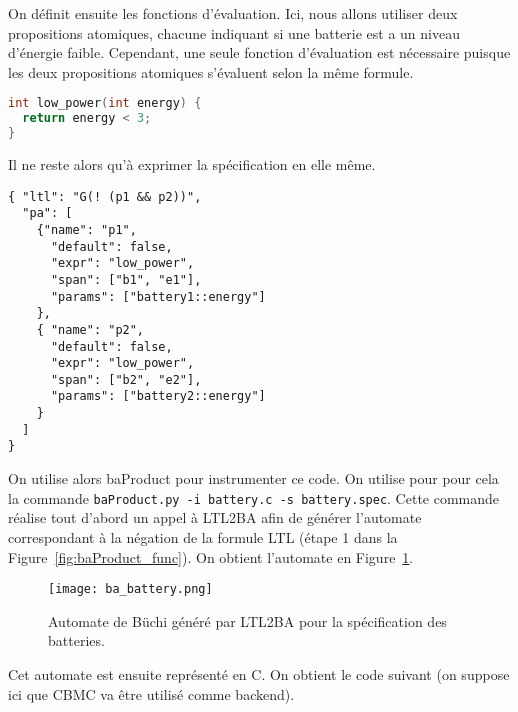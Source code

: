 On définit ensuite les fonctions d'évaluation. Ici, nous allons utiliser deux
propositions atomiques, chacune indiquant si une batterie est a un niveau
d'énergie faible. Cependant, une seule fonction d'évaluation est nécessaire
puisque les deux propositions atomiques s'évaluent selon la même formule.

\begin{lstlisting}[language=C, frame=single, caption=Fonction d'évaluation]
int low_power(int energy) {
  return energy < 3;
}
\end{lstlisting}

Il ne reste alors qu'à exprimer la spécification en elle même.

\begin{lstlisting}[frame=single, caption=Spécification]
{ "ltl": "G(! (p1 && p2))",
  "pa": [
    {"name": "p1",
      "default": false,
      "expr": "low_power",
      "span": ["b1", "e1"],
      "params": ["battery1::energy"]
    },
    { "name": "p2",
      "default": false,
      "expr": "low_power",
      "span": ["b2", "e2"],
      "params": ["battery2::energy"]
    }
  ]
}
\end{lstlisting}

On utilise alors baProduct pour instrumenter ce code. On utilise pour pour cela
la commande \texttt{baProduct.py -i battery.c -s battery.spec}. Cette commande
réalise tout d'abord un appel à LTL2BA afin de générer l'automate correspondant
à la négation de la formule LTL (étape 1 dans la
Figure~\ref{fig:baProduct_func}). On obtient l'automate en
Figure~\ref{fig:ba_battery}.

\begin{figure}[ht]
\begin{center}
  \texttt{[image: ba\_battery.png]}
\end{center}
\caption{Automate de Büchi généré par LTL2BA pour la spécification des
batteries.}
\label{fig:ba_battery}
\end{figure}

Cet automate est ensuite représenté en C. On obtient le code suivant (on suppose
ici que CBMC va être utilisé comme backend).

